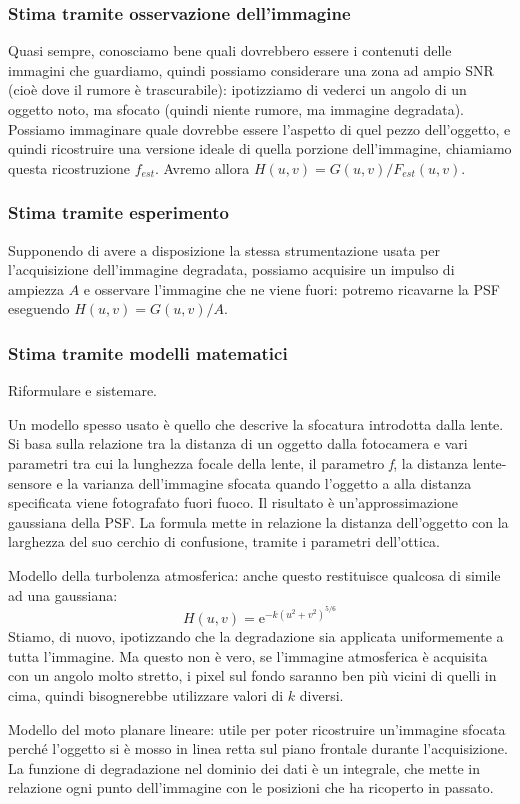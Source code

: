 \documentclass[a4paper,11pt]{article}
\begin{document}
\subsubsection{Stima tramite osservazione dell'immagine}
Quasi sempre, conosciamo bene quali dovrebbero essere i contenuti delle immagini che guardiamo, quindi possiamo considerare una zona ad ampio SNR
(cioè dove il rumore è trascurabile): ipotizziamo di vederci un angolo di un oggetto noto, ma sfocato (quindi niente rumore, ma immagine degradata).
Possiamo immaginare quale dovrebbe essere l'aspetto di quel pezzo dell'oggetto, e quindi ricostruire una versione ideale di quella porzione
dell'immagine, chiamiamo questa ricostruzione $f_{est}$. Avremo allora $H(u,v) = G(u,v)/F_{est}(u,v)$.

\subsubsection{Stima tramite esperimento}
Supponendo di avere a disposizione la stessa strumentazione usata per l'acquisizione dell'immagine degradata,
possiamo acquisire un impulso di ampiezza $A$ e osservare l'immagine che ne viene fuori: potremo ricavarne la PSF eseguendo $H(u,v) = G(u,v)/A$.

\subsubsection{Stima tramite modelli matematici}
Riformulare e sistemare. \par
Un modello spesso usato è quello che descrive la sfocatura introdotta dalla lente. Si basa sulla relazione tra la distanza di un oggetto
dalla fotocamera e vari parametri tra cui la lunghezza focale della lente, il parametro \textit{f}, la distanza lente-sensore e la varianza
dell'immagine sfocata quando l'oggetto a alla distanza specificata viene fotografato fuori fuoco. Il risultato è un'approssimazione gaussiana
della PSF.
La formula mette in relazione la distanza dell'oggetto con la larghezza del suo cerchio di confusione, tramite i parametri dell'ottica.
\par
Modello della turbolenza atmosferica: anche questo restituisce qualcosa di simile ad una gaussiana:
\[
H(u,v) = \mathrm{e}^{-k(u^2+v^2)^{5/6}}
\]
Stiamo, di nuovo, ipotizzando che la degradazione sia applicata uniformemente a tutta l'immagine. Ma questo non è vero, se l'immagine atmosferica
è acquisita con un angolo molto stretto, i pixel sul fondo saranno ben più vicini di quelli in cima, quindi bisognerebbe utilizzare valori
di $k$ diversi.
\par
Modello del moto planare lineare: utile per poter ricostruire un'immagine sfocata perché l'oggetto si è mosso in linea retta
sul piano frontale durante l'acquisizione. La funzione di degradazione nel dominio dei dati è un integrale, che mette in relazione ogni punto dell'immagine
con le posizioni che ha ricoperto in passato.
\end{document}
